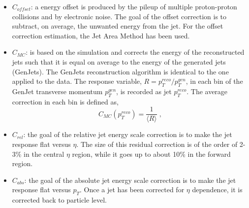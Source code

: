 \begin{itemize}
\item $C_{offset}$: a energy offset is produced by the pileup of multiple proton-proton collisions and by electronic noise.
The goal of the offset correction is to subtract, on average, the unwanted
energy from the jet. For the offset correction estimation, the Jet Area Method has been used. 
\item $C_{MC}$: is based on the simulation and corrects the energy of the reconstructed
jets such that it is equal on average to the energy of the generated jets (GenJets). The
GenJets reconstruction algorithm is identical to the one applied to the data.
The response variable, $R=p_T^{reco}/p_T^{gen}$, in each bin of the GenJet transverse momentum $p_T^{gen}$, is recorded as jet $p_T^{reco}$.
The average correction in each bin is defined as,
\begin{equation}
  C_{MC}(p_T^{reco})= \frac{1}{\langle R \rangle } \; ,
\end{equation}
\item $C_{rel}$: the goal of the relative jet energy scale correction is to make the jet response flat versus $\eta$. 
The size of this residual correction is of the order of 2-3\% in the
central $\eta$ region, while it goes up to about 10\% in the forward region.
\item $C_{abs}$: the goal of the absolute jet energy scale correction is to make the jet response flat versus $p_T$.
Once a jet has been corrected for $\eta$ dependence, it is corrected back to particle
level.
\end{itemize}
